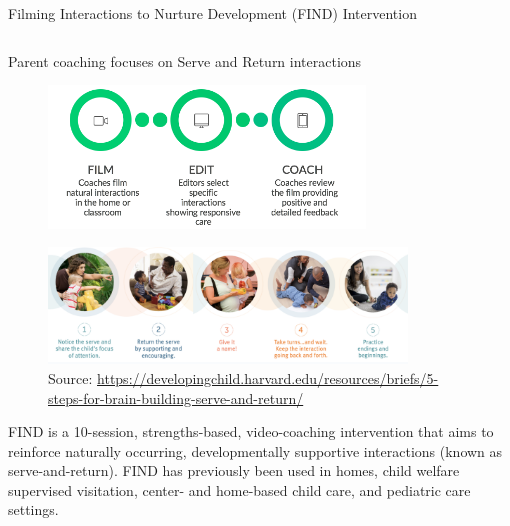 \documentclass[final]{beamer}
\begin{document}
\begin{frame}[t]
\begin{columns}[t]
\begin{column}{\textwidth}
  \vspace{-0.5cm}
  \begin{block}{Filming Interactions to Nurture Development (FIND) Intervention}
    \begin{columns}[t]
      \begin{column}{0.48\textwidth}
              \vspace{-0.4cm}  %
          \begin{block}{Parent coaching focuses on Serve and Return interactions}
        \begin{figure}[ht]
          \centering
          \includegraphics[clip, width=0.75\textwidth]{find.png}
          \label{fig:find}
        \end{figure}
        \vspace{-1cm}
        \begin{figure}[ht]
          \centering
          \includegraphics[clip, width=0.85\textwidth]{servereturn.png}
          \label{fig:servereturn}
          \\[0.5em]
          \vspace{-0.5cm}
          {\tiny Source: \url{https://developingchild.harvard.edu/resources/briefs/5-steps-for-brain-building-serve-and-return/}}
        \label{fig:servereturn}
       \end{figure}
             \end{block}
        \vspace{-0.5cm}
        FIND is a 10-session, strengths-based, video-coaching intervention that aims to reinforce naturally occurring, developmentally supportive interactions (known as serve-and-return). FIND has previously been used in homes, child welfare supervised visitation, center- and home-based child care, and pediatric care settings.


\end{column}
\end{columns}
\end{block}
\end{column}
\end{columns}
\end{frame}
\end{document}
